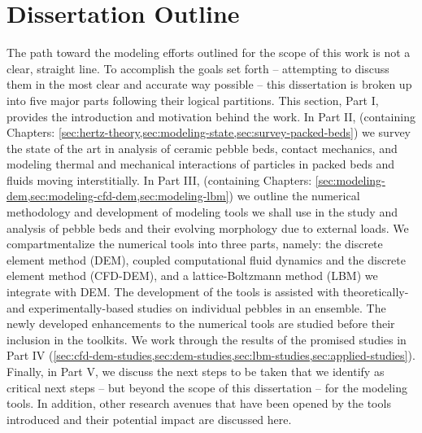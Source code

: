 \chapter{Dissertation Outline}
The path toward the modeling efforts outlined for the scope of this work is not a clear, straight line. To accomplish the goals set forth -- attempting to discuss them in the most clear and accurate way possible -- this dissertation is broken up into five major parts following their logical partitions. This section, Part I, provides the introduction and motivation behind the work. In Part II, (containing Chapters: \cref{sec:hertz-theory,sec:modeling-state,sec:survey-packed-beds}) we survey the state of the art in analysis of ceramic pebble beds, contact mechanics, and modeling thermal and mechanical interactions of particles in packed beds and fluids moving interstitially.  In Part III, (containing Chapters: \cref{sec:modeling-dem,sec:modeling-cfd-dem,sec:modeling-lbm}) we outline the numerical methodology and development of modeling tools we shall use in the study and analysis of pebble beds and their evolving morphology due to external loads. We compartmentalize the numerical tools into three parts, namely: the discrete element method (DEM), coupled computational fluid dynamics and the discrete element method (CFD-DEM), and a lattice-Boltzmann method (LBM) we integrate with DEM. The development of the tools is assisted with theoretically- and experimentally-based studies on individual pebbles in an ensemble. The newly developed enhancements to the numerical tools are studied before their inclusion in the toolkits. We work through the results of the promised studies in Part IV (\cref{sec:cfd-dem-studies,sec:dem-studies,sec:lbm-studies,sec:applied-studies}). Finally, in Part V, we discuss the next steps to be taken that we identify as critical next steps -- but beyond the scope of this dissertation -- for the modeling tools. In addition, other research avenues that have been opened by the tools introduced and their potential impact are discussed here.